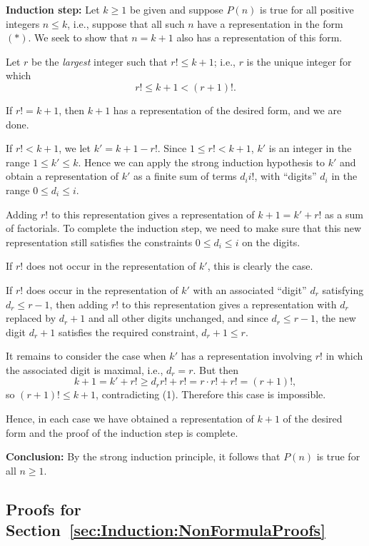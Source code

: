 \textbf{Induction step:} 
Let $k\ge1$ be given and suppose $P(n)$ is true for all positive
integers $ n\le k$, i.e., suppose that all such $n$ have a
representation in the form $(*)$. We seek to show that $n=k+1$ also has a
representation of this form. 

Let $r$ be the \emph{largest} integer such that $r!\le k+1$; i.e., $r$ is the
unique integer for which  
\[
r!\le k+1 < (r+1)!.
\tag{1}
\]

If $r!=k+1$, then $k+1$ has a representation of the desired form,
and we are done.

If $r!<k+1$, we let $k'=k+1-r!$.  Since $1\le r!<k+1$, 
$k'$ is an integer in the range $1\le k'\le k$. 
Hence we can apply the strong induction hypothesis to $k'$ and obtain a
representation of $k'$ as a finite sum of terms $d_ii!$, with ``digits'' 
$d_i$ in the range $0\le d_i\le i$.  

Adding $r!$ to this representation gives a representation of $k+1=k'+r!$
as a sum of factorials.  To complete the induction step, we need to make sure
that this new representation still satisfies the constraints $0\le d_i\le i$ 
on the digits. 

If $r!$ does not occur in the representation of $k'$, this is clearly the case.

If $r!$ does occur in the representation of $k'$ with an associated
``digit'' $d_r$ satisfying $d_r\le r-1$, 
then adding $r!$ to this representation gives a
representation with $d_r$ replaced by $d_r+1$ and all other digits unchanged, 
and since $d_r\le r-1$, the new digit $d_r+1$ satisfies the required
constraint, $d_r+1\le r$.

It remains to consider the case when $k'$ has a representation involving $r!$
in which the associated digit is maximal, i.e., $d_r=r$. But then 
\[
k+1=k'+r!\ge d_rr!+r! =r\cdot r! + r!=(r+1)!,
\]
so $(r+1)!\le k+1$, contradicting (1). Therefore this case is impossible. 

Hence, in each case we have obtained a representation of $k+1$ of the 
desired form and the proof of the 
induction step is complete.

\textbf{Conclusion:} By the strong induction principle, 
it follows that $P(n)$  is true for all $n\ge1$.

\subsection{Proofs for Section~\ref{sec:Induction:NonFormulaProofs}}

